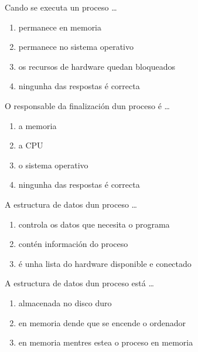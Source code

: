 \begin{diapo}\begin{frame}{Cando se executa un proceso \dots}
\begin{enumerate}
\item  permanece en memoria \pause
\item  permanece no sistema operativo \pause
\item os recursos de hardware quedan bloqueados
\item ningunha das respostas é correcta
\end{enumerate} 
\end{frame} 
\end{diapo} 
\begin{diapo}\begin{frame}{O responsable da finalización dun proceso é \dots}
\begin{enumerate}
\item  a memoria \pause
\item  a CPU\pause
\item o sistema operativo
\item ningunha das respostas é correcta
\end{enumerate} 
\end{frame} 
\end{diapo} 


\begin{diapo} \begin{frame}{ A estructura de datos dun proceso   \dots} 
\begin{enumerate}
	\item controla os datos que necesita o programa\pause
	\item contén información do proceso \pause
	\item é unha lista do hardware disponible e conectado 
\end{enumerate} \end{frame}  \end{diapo}  
\begin{diapo}\begin{frame}{ A estructura de datos dun proceso está  \dots}
\begin{enumerate}
	\item  almacenada no disco duro \pause
	\item  en memoria dende que se encende o ordenador \pause
	\item en memoria mentres estea o proceso en memoria 
\end{enumerate} \end{frame} \end{diapo}



